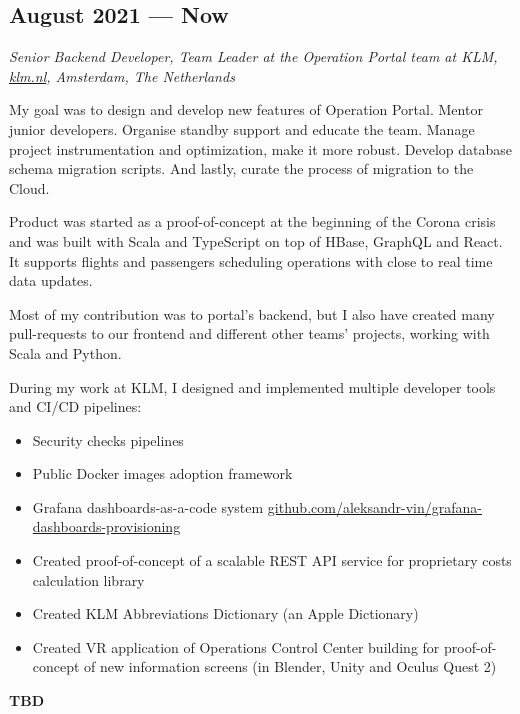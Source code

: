 \subsection*{August 2021 — Now}

\textit{Senior Backend Developer, Team Leader at the Operation Portal team at KLM, \href{https://klm.nl}{klm.nl}, Amsterdam, The Netherlands}

My goal was to design and develop new features of Operation Portal. Mentor junior developers.
Organise standby support and educate the team. Manage project instrumentation and optimization, make it more robust.
Develop database schema migration scripts. And lastly, curate the process of migration to the Cloud.

Product was started as a proof-of-concept at the beginning of the Corona crisis and was built with Scala
and TypeScript on top of HBase, GraphQL and React. It supports flights and passengers scheduling
operations with close to real time data updates.

Most of my contribution was to portal's backend, but I also have created many pull-requests to our frontend and
different other teams' projects, working with Scala and Python.

During my work at KLM, I designed and implemented multiple developer tools and CI/CD pipelines:
\begin{itemize}[noitemsep, nosep]
  \item Security checks pipelines
  \item Public Docker images adoption framework
  \item Grafana dashboards-as-a-code system
  \href{https://github.com/aleksandr-vin/grafana-dashboards-provisioning}{github.com/aleksandr-vin/grafana-dashboards-provisioning}
  \item Created proof-of-concept of a scalable REST API service for proprietary costs calculation library
  \item Created KLM Abbreviations Dictionary (an Apple Dictionary)
  \item Created VR application of Operations Control Center building for proof-of-concept of new information screens
  (in Blender, Unity and Oculus Quest 2)
\end{itemize}

\textbf{\Huge TBD}
